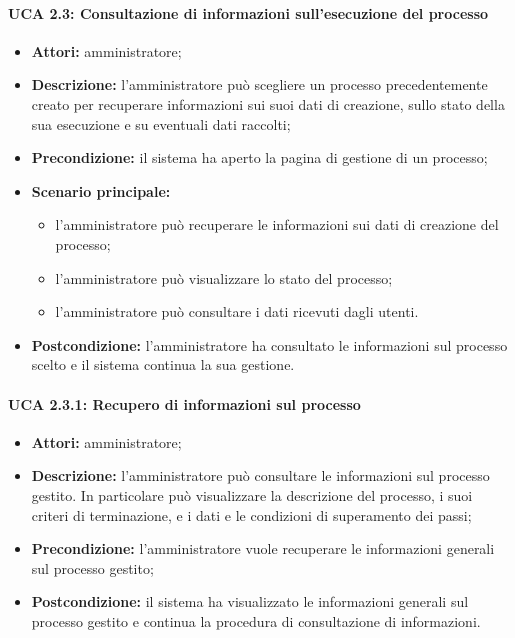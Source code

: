 \paragraph{UCA 2.3: Consultazione di informazioni sull'esecuzione del processo}
\begin{itemize}
\item \textbf{Attori:} amministratore;
\item \textbf{Descrizione:} 
l'amministratore può scegliere un processo precedentemente creato per recuperare informazioni sui suoi dati di creazione, sullo stato della sua esecuzione e su eventuali dati raccolti; 
\item \textbf{Precondizione:} 
il sistema ha aperto la pagina di gestione di un processo;
\item \textbf{Scenario principale:} 
\begin{itemize}
\item l'amministratore può recuperare le informazioni sui dati di creazione del processo;
\item l'amministratore può visualizzare lo stato del processo;
\item l'amministratore può consultare i dati ricevuti dagli utenti.
\end{itemize}
\item \textbf{Postcondizione:} 
l'amministratore ha consultato le informazioni sul processo scelto e il sistema continua la sua gestione.
\end{itemize}

\paragraph{UCA 2.3.1: Recupero di informazioni sul processo}
\begin{itemize}
\item \textbf{Attori:} 
amministratore;
\item \textbf{Descrizione:} 
l'amministratore può consultare le informazioni sul processo gestito. In particolare può visualizzare la descrizione del processo, i suoi criteri di terminazione, e i dati e le condizioni di superamento dei passi; 
\item \textbf{Precondizione:} 
l'amministratore vuole recuperare le informazioni generali sul processo gestito;
\item \textbf{Postcondizione:} 
il sistema ha visualizzato le informazioni generali sul processo gestito e continua la procedura di consultazione di informazioni.
\end{itemize}

